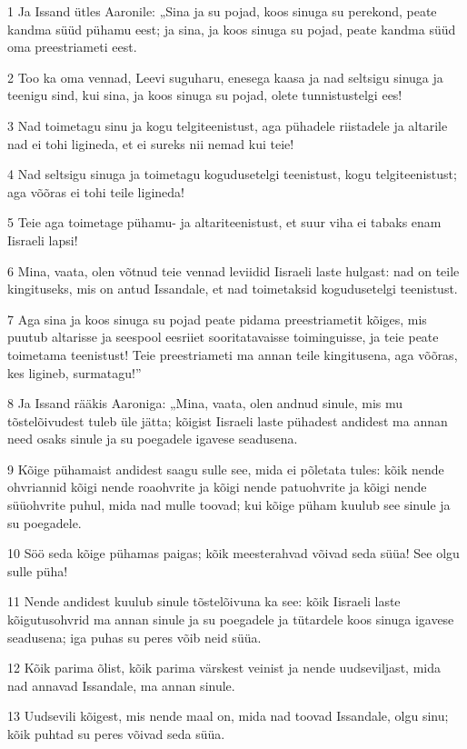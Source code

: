 \par 1 Ja Issand ütles Aaronile: „Sina ja su pojad, koos sinuga su perekond, peate kandma süüd pühamu eest; ja sina, ja koos sinuga su pojad, peate kandma süüd oma preestriameti eest.
\par 2 Too ka oma vennad, Leevi suguharu, enesega kaasa ja nad seltsigu sinuga ja teenigu sind, kui sina, ja koos sinuga su pojad, olete tunnistustelgi ees!
\par 3 Nad toimetagu sinu ja kogu telgiteenistust, aga pühadele riistadele ja altarile nad ei tohi ligineda, et ei sureks nii nemad kui teie!
\par 4 Nad seltsigu sinuga ja toimetagu kogudusetelgi teenistust, kogu telgiteenistust; aga võõras ei tohi teile ligineda!
\par 5 Teie aga toimetage pühamu- ja altariteenistust, et suur viha ei tabaks enam Iisraeli lapsi!
\par 6 Mina, vaata, olen võtnud teie vennad leviidid Iisraeli laste hulgast: nad on teile kingituseks, mis on antud Issandale, et nad toimetaksid kogudusetelgi teenistust.
\par 7 Aga sina ja koos sinuga su pojad peate pidama preestriametit kõiges, mis puutub altarisse ja seespool eesriiet sooritatavaisse toiminguisse, ja teie peate toimetama teenistust! Teie preestriameti ma annan teile kingitusena, aga võõras, kes ligineb, surmatagu!”
\par 8 Ja Issand rääkis Aaroniga: „Mina, vaata, olen andnud sinule, mis mu tõstelõivudest tuleb üle jätta; kõigist Iisraeli laste pühadest andidest ma annan need osaks sinule ja su poegadele igavese seadusena.
\par 9 Kõige pühamaist andidest saagu sulle see, mida ei põletata tules: kõik nende ohvriannid kõigi nende roaohvrite ja kõigi nende patuohvrite ja kõigi nende süüohvrite puhul, mida nad mulle toovad; kui kõige püham kuulub see sinule ja su poegadele.
\par 10 Söö seda kõige pühamas paigas; kõik meesterahvad võivad seda süüa! See olgu sulle püha!
\par 11 Nende andidest kuulub sinule tõstelõivuna ka see: kõik Iisraeli laste kõigutusohvrid ma annan sinule ja su poegadele ja tütardele koos sinuga igavese seadusena; iga puhas su peres võib neid süüa.
\par 12 Kõik parima õlist, kõik parima värskest veinist ja nende uudseviljast, mida nad annavad Issandale, ma annan sinule.
\par 13 Uudsevili kõigest, mis nende maal on, mida nad toovad Issandale, olgu sinu; kõik puhtad su peres võivad seda süüa.
